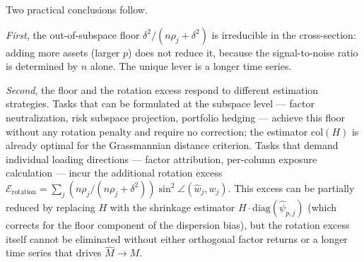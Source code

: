 \documentclass{article}
\theoremstyle{remark}
\begin{document}
Two practical conclusions follow.

\textit{First}, the out-of-subspace floor $\delta^2/(n\rho_j + \delta^2)$ is irreducible in the cross-section: adding more assets (larger $p$) does not reduce it, because the signal-to-noise ratio is determined by $n$ alone. The unique lever is a longer time series.

\textit{Second}, the floor and the rotation excess respond to different estimation strategies. Tasks that can be formulated at the subspace level — factor neutralization, risk subspace projection, portfolio hedging — achieve this floor without any rotation penalty and require no correction; the estimator $\mathrm{col}(H)$ is already optimal for the Grassmannian distance criterion. Tasks that demand individual loading directions — factor attribution, per-column exposure calculation — incur the additional rotation excess $\mathcal{E}_{\mathrm{rotation}} = \sum_j (n\rho_j/(n\rho_j + \delta^2))\sin^2\angle(\hat{w}_j, w_j)$. This excess can be partially reduced by replacing $H$ with the shrinkage estimator $H \cdot \mathrm{diag}(\hat{\psi}_{p,j})$ (which corrects for the floor component of the dispersion bias), but the rotation excess itself cannot be eliminated without either orthogonal factor returns or a longer time series that drives $\hat{M} \to M$.
\end{document}
